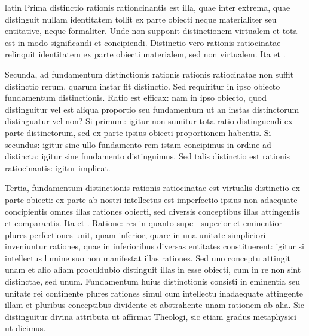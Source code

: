 \begin{otherlanguage*}{latin}
\pstart
Prima distinctio rationis rationcinantis est illa, quae inter extrema, quae distinguit nullam identitatem tollit ex parte obiecti neque materialiter seu entitative, neque formaliter. Unde non supponit distinctionem virtualem et tota est in modo significandi et concipiendi. Distinctio vero rationis ratiocinatae relinquit identitatem ex parte obiecti materialem, sed non virtualem. Ita  et . 
\pend

\pstart
Secunda, ad fundamentum distinctionis rationis rationis ratiocinatae non suffit distinctio rerum, quarum instar fit distinctio. Sed requiritur in ipso obiecto fundamentum distinctionis. Ratio est efficax:
nam in ipso obiecto, quod distinguitur vel est aliqua proportio seu fundamentum ut an instas distinctorum distinguatur vel non? Si primum:
igitur non sumitur tota ratio distinguendi ex parte distinctorum, sed ex parte ipsius obiecti proportionem habentis. Si secundus:
igitur sine ullo fundamento rem istam concipimus in ordine ad distincta:
igitur sine fundamento distinguimus. Sed talis distinctio est rationis ratiocinantis:
igitur implicat. 
\pend

\pstart
Tertia, fundamentum distinctionis rationis ratiocinatae est virtualis distinctio ex parte obiecti:
ex parte ab nostri intellectus est imperfectio ipsius non adaequate concipientis omnes illas rationes obiecti, sed diversis conceptibus illas attingentis et comparantis. Ita  et . Ratione:
res in quanto supe \textnormal{|} superior et eminentior plures perfectiones unit, quam inferior, quare in una unitate simpliciori inveniuntur rationes, quae in inferioribus diversas entitates constituerent:
igitur si intellectus lumine suo non manifestat illas rationes. Sed uno conceptu attingit unam et alio aliam proculdubio distinguit illas in esse obiecti, cum in re non sint distinctae, sed unum. Fundamentum huius distinctionis consisti in eminentia seu unitate rei continente plures rationes simul cum intellectu inadaequate attingente illam et pluribus conceptibus dividente et abstrahente unam rationem ab alia. Sic distinguitur divina attributa ut affirmat Theologi, sic etiam gradus metaphysici ut dicimus. 
\pend


\end{otherlanguage*}
